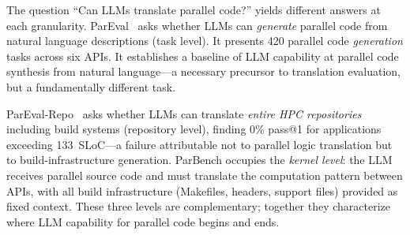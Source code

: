\documentclass[conference]{IEEEtran}
\begin{document}
The question ``Can LLMs translate parallel code?'' yields different answers at each granularity. ParEval~\cite{ParEval2024} asks whether LLMs can \emph{generate} parallel code from natural language descriptions (task level). It presents 420 parallel code \emph{generation} tasks across six APIs. It establishes a baseline of LLM capability at parallel code synthesis from natural language---a necessary precursor to translation evaluation, but a fundamentally different task. 

ParEval-Repo~\cite{ParEvalRepo2025} asks whether LLMs can translate \emph{entire HPC repositories} including build systems (repository level), finding 0\% pass@1 for applications exceeding 133~SLoC---a failure attributable not to parallel logic translation but to build-infrastructure generation. ParBench occupies the \emph{kernel level}: the LLM receives parallel source code and must translate the computation pattern between APIs, with all build infrastructure (Makefiles, headers, support files) provided as fixed context. These three levels are complementary; together they characterize where LLM capability for parallel code begins and ends.




\end{document}
